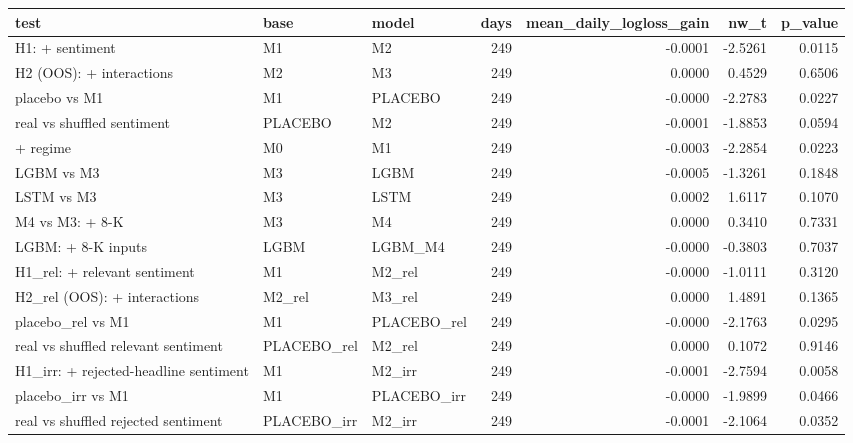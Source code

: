 \begin{tabular}{lllrrrr}
\toprule
test & base & model & days & mean\_daily\_logloss\_gain & nw\_t & p\_value \\
\midrule
H1: + sentiment & M1 & M2 & 249 & -0.0001 & -2.5261 & 0.0115 \\
H2 (OOS): + interactions & M2 & M3 & 249 & 0.0000 & 0.4529 & 0.6506 \\
placebo vs M1 & M1 & PLACEBO & 249 & -0.0000 & -2.2783 & 0.0227 \\
real vs shuffled sentiment & PLACEBO & M2 & 249 & -0.0001 & -1.8853 & 0.0594 \\
+ regime & M0 & M1 & 249 & -0.0003 & -2.2854 & 0.0223 \\
LGBM vs M3 & M3 & LGBM & 249 & -0.0005 & -1.3261 & 0.1848 \\
LSTM vs M3 & M3 & LSTM & 249 & 0.0002 & 1.6117 & 0.1070 \\
M4 vs M3: + 8-K & M3 & M4 & 249 & 0.0000 & 0.3410 & 0.7331 \\
LGBM: + 8-K inputs & LGBM & LGBM\_M4 & 249 & -0.0000 & -0.3803 & 0.7037 \\
H1\_rel: + relevant sentiment & M1 & M2\_rel & 249 & -0.0000 & -1.0111 & 0.3120 \\
H2\_rel (OOS): + interactions & M2\_rel & M3\_rel & 249 & 0.0000 & 1.4891 & 0.1365 \\
placebo\_rel vs M1 & M1 & PLACEBO\_rel & 249 & -0.0000 & -2.1763 & 0.0295 \\
real vs shuffled relevant sentiment & PLACEBO\_rel & M2\_rel & 249 & 0.0000 & 0.1072 & 0.9146 \\
H1\_irr: + rejected-headline sentiment & M1 & M2\_irr & 249 & -0.0001 & -2.7594 & 0.0058 \\
placebo\_irr vs M1 & M1 & PLACEBO\_irr & 249 & -0.0000 & -1.9899 & 0.0466 \\
real vs shuffled rejected sentiment & PLACEBO\_irr & M2\_irr & 249 & -0.0001 & -2.1064 & 0.0352 \\
\bottomrule
\end{tabular}
